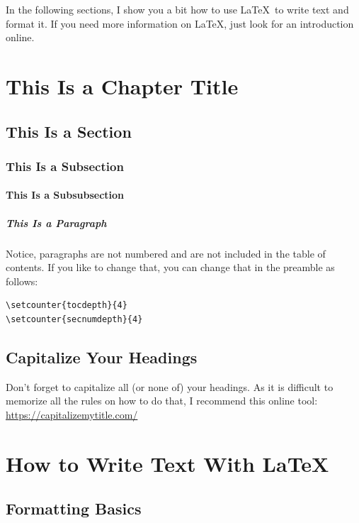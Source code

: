 \documentclass[12pt,final,a4paper,oneside]{book}
\begin{document}
In the following sections, I show you a bit how to use \LaTeX\ to write text and format it. If you need more information on \LaTeX, just look for an introduction online. 



	
\chapter{This Is a Chapter Title}
\section{This Is a Section}
\subsection{This Is a Subsection}
\subsubsection{This Is a Subsubsection}
\paragraph{This Is a Paragraph}
	
Notice, paragraphs are not numbered and are not included in the table of contents. If you like to change that, you can change that in the preamble as follows:
\begin{verbatim}
\setcounter{tocdepth}{4}
\setcounter{secnumdepth}{4}
\end{verbatim}

\section{Capitalize Your Headings}
Don't forget to capitalize all (or none of) your headings. As it is difficult to memorize all the rules on how to do that, I recommend this online tool:\\ \url{https://capitalizemytitle.com/}


 
\chapter{How to Write Text With \LaTeX}
	
\section{Formatting Basics}
	
\end{document}
